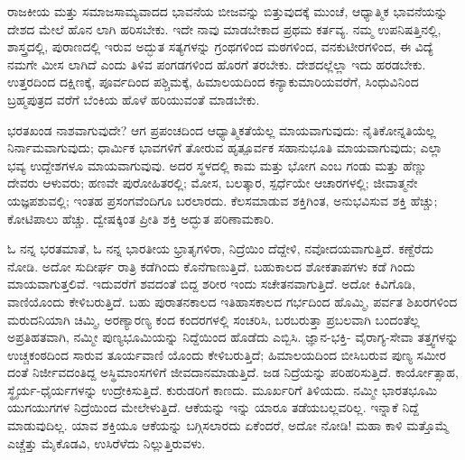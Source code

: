 ರಾಜಕೀಯ ಮತ್ತು ಸಮಾಜಸಾಮ್ಯವಾದದ ಭಾವನೆಯ ಬೀಜವನ್ನು ಬಿತ್ತುವುದಕ್ಕೆ ಮುಂಚೆ, ಆಧ್ಯಾತ್ಮಿಕ ಭಾವನೆಯನ್ನು ದೇಶದ ಮೇಲೆ ಹೊನ ಲಾಗಿ ಹರಿಸಬೇಕು. ಇದೇ ನಾವು ಮಾಡಬೇಕಾದ ಪ್ರಥಮ ಕರ್ತವ್ಯ. ನಮ್ಮ ಉಪನಿಷತ್ತಿನಲ್ಲಿ, ಶಾಸ್ತ್ರದಲ್ಲಿ, ಪುರಾಣದಲ್ಲಿ ಇರುವ ಅದ್ಭುತ ಸತ್ಯಗಳನ್ನು ಗ್ರಂಥಗಳಿಂದ ಮಠಗಳಿಂದ, ವನಕುಟೀರಗಳಿಂದ, ಈ ವಿದ್ಯೆ ನಮಗೇ ಮೀಸ ಲಾಗಿದೆ ಎಂದು ತಿಳಿವ ಪಂಗಡಗಳಿಂದ ಹೊರಗೆ ತರಬೇಕು. ದೇಶದಲ್ಲೆಲ್ಲಾ ಇದು ಹರಡಬೇಕು. ಉತ್ತರದಿಂದ ದಕ್ಷಿಣಕ್ಕೆ, ಪೂರ್ವದಿಂದ ಪಶ್ಚಿಮಕ್ಕೆ, ಹಿಮಾಲಯದಿಂದ ಕನ್ಯಾಕುಮಾರಿಯವರೆಗೆ, ಸಿಂಧುವಿನಿಂದ ಬ್ರಹ್ಮಪುತ್ರದ ವರೆಗೆ ಬೆಂಕಿಯ ಹೊಳೆ ಹರಿಯುವಂತೆ ಮಾಡಬೇಕು.

ಭರತಖಂಡ ನಾಶವಾಗುವುದೇ? ಆಗ ಪ್ರಪಂಚದಿಂದ ಆಧ್ಯಾತ್ಮಿಕತೆಯೆಲ್ಲ ಮಾಯವಾಗುವುದು: ನೈತಿಕೋನ್ನತಿಯೆಲ್ಲ ನಿರ್ನಾಮವಾಗುವುದು; ಧಾರ್ಮಿಕ ಭಾವಗಳಿಗೆ ತೋರುವ ಹೃತ್ಪೂರ್ವಕ ಸಹಾನುಭೂತಿ ಮಾಯವಾಗುವುದು; ಎಲ್ಲಾ ಭವ್ಯ ಉದ್ದೇಶಗಳೂ ಮಾಯವಾಗುವುವು. ಅದರ ಸ್ಥಳದಲ್ಲಿ ಕಾಮ ಮತ್ತು ಭೋಗ ಎಂಬ ಗಂಡು ಮತ್ತು ಹೆಣ್ಣು ದೇವರು ಆಳುವರು; ಹಣವೇ ಪುರೋಹಿತರಲ್ಲಿ; ಮೋಸ, ಬಲತ್ಕಾರ, ಸ್ಪರ್ಧೆಯೇ ಆಚಾರಗಳಲ್ಲಿ; ಜೀವಾತ್ಮನೇ ಯಜ್ಞಪಶುವಲ್ಲಿ; ಇಂತಹ ಪ್ರಸಂಗವೆಂದಿಗೂ ಬರಲಾರದು. ಕೆಲಸಮಾಡುವ ಶಕ್ತಿಗಿಂತ, ಅನುಭವಿಸುವ ಶಕ್ತಿ ಹೆಚ್ಚು; ಕೋಟಿಪಾಲು ಹೆಚ್ಚು. ದ್ವೇಷಕ್ಕಿಂತ ಪ್ರೀತಿ ಶಕ್ತಿ ಅದ್ಭುತ ಪರಿಣಾಮಕಾರಿ.

ಓ ನನ್ನ ಭರತಮಾತೆ, ಓ ನನ್ನ ಭಾರತೀಯ ಭ್ರಾತೃಗಳಿರಾ, ನಿದ್ರೆಯಿಂ ದೆದ್ದೇಳಿ, ನವೋದಯವಾಗುತ್ತಿದೆ. ಕಣ್ದೆರೆದು ನೋಡಿ. ಅದೋ ಸುದೀರ್ಘ ರಾತ್ರಿ ಕಡೆಗಿಂದು ಕೊನೆಗಾಣುತ್ತಿದೆ. ಬಹುಕಾಲದ ಶೋಕತಾಪಗಳು ಕಡೆ ಗಿಂದು ಮಾಯವಾಗುತ್ತಲಿವೆ. ಇದುವರೆಗೆ ಶವದಂತೆ ಬಿದ್ದ ಶರೀರ ಇಂದು ಸಚೇತನವಾಗುತ್ತಿದೆ. ಅದೋ ಕಿವಿಗೊಡಿ, ವಾಣಿಯೊಂದು ಕೇಳಿಬರುತ್ತಿದೆ. ಬಹು ಪುರಾತನಕಾಲದ ಇತಿಹಾಸಕಾಲದ ಗರ್ಭದಿಂದ ಹೊಮ್ಮಿ, ಪರ್ವತ ಶಿಖರಗಳಿಂದ ಮರುದನಿಯಾಗಿ ಚಿಮ್ಮಿ, ಅರಣ್ಯಾರಣ್ಯ ಕಂದ ಕಂದರಗಳಲ್ಲಿ ಸಂಚರಿಸಿ, ಬರಬರುತ್ತಾ ಪ್ರಬಲವಾಗಿ ಬಂದಂತೆಲ್ಲ ಅಪ್ರತಿಹತವಾಗಿ, ನಮ್ಮೀ ಪುಣ್ಯಭೂಮಿಯನ್ನು ನಿದ್ದೆಯಿಂದ ಹೊಡೆದು ಎಬ್ಬಿಸಿ. ಜ್ಞಾನ-ಭಕ್ತಿ- ವೈರಾಗ್ಯ-ಸೇವಾ ತತ್ತ್ವಗಳನ್ನು ಉಚ್ಚಕಂಠದಿಂದ ಸಾರುವ ತೂರ್ಯವಾಣಿ ಯೊಂದು ಕೇಳಿಬರುತ್ತಿದೆ; ಹಿಮಾಲಯದಿಂದ ಬೀಸಿಬರುವ ಪುಣ್ಯ ಸಮೀರ ದಂತೆ ನಿರ್ಜೀವದಂತಿದ್ದ ಅಸ್ಥಿಮಾಂಸಗಳಿಗೆ ಜೀವದಾನಮಾಡುತ್ತಿದೆ. ಜಡ ನಿದ್ರೆಯನ್ನು ಪರಿಹರಿಸುತ್ತಿದೆ. ಕಾರ್ಯೋತ್ಸಾಹ, ಸ್ಥೈರ್ಯ-ಧೈರ್ಯಗಳನ್ನು ಉದ್ರೇಕಿಸುತ್ತಿದೆ. ಕುರುಡರಿಗೆ ಕಾಣದು. ಮೂರ್ಖರಿಗೆ ತಿಳಿಯದು. ನಮ್ಮೀ ಭಾರತಭೂಮಿ ಯುಗಯುಗಗಳ ನಿದ್ರೆಯಿಂದ ಮೇಲೇಳುತ್ತಿದೆ. ಆಕೆಯನ್ನು ಇನ್ನು ಯಾರೂ ತಡೆಯಬಲ್ಲವರಿಲ್ಲ. ಇನ್ನಾಕೆ ನಿದ್ದೆ ಮಾಡುವುದಿಲ್ಲ. ಯಾವ ಶಕ್ತಿಯೂ ಆಕೆಯನ್ನು ಬಗ್ಗಿಸಲಾರದು ಏಕೆಂದರೆ, ಅದೋ ನೋಡಿ! ಮಹಾ ಕಾಳಿ ಮತ್ತೊಮ್ಮೆ ಎಚ್ಚೆತ್ತು ಮೈಕೊಡವಿ, ಉಸಿರೆಳೆದು ನಿಲ್ಲುತ್ತಿರುವಳು.

